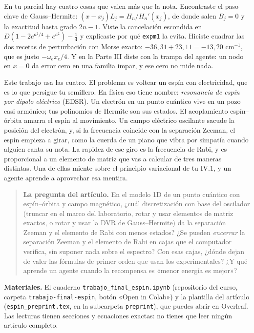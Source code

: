 En tu parcial hay cuatro cosas que valen más que la nota. Encontraste el paso clave de Gauss--Hermite: $(x-x_j)L_j = H_n/H_n'(x_j)$, de donde salen $B_j = 0$ y la exactitud hasta grado $2n-1$. Viste la cancelación escondida en $D(1-2e^{a^2/4}+e^{a^2})-\tfrac14$ y explicaste por qué \texttt{expm1} la evita. Hiciste cuadrar las dos recetas de perturbación con Morse exacto: $-36{,}31 + 23{,}11 = -13{,}20$ cm$^{-1}$, que es justo $-\omega_e x_e/4$. Y en la Parte III diste con la trampa del agente: un nodo en $x = 0$ da error cero en una familia impar, y ese cero no mide nada.

Este trabajo usa las cuatro. El problema es voltear un espín con electricidad, que es lo que persigue tu semillero. En física eso tiene nombre: \emph{resonancia de espín por dipolo eléctrico} (EDSR). Un electrón en un punto cuántico vive en un pozo casi armónico; tus polinomios de Hermite son sus estados. El acoplamiento espín--órbita amarra el espín al movimiento. Un campo eléctrico oscilante sacude la posición del electrón, y, si la frecuencia coincide con la separación Zeeman, el espín empieza a girar, como la cuerda de un piano que vibra por simpatía cuando alguien canta su nota. La rapidez de ese giro es la frecuencia de Rabi, y es proporcional a un elemento de matriz que vas a calcular de tres maneras distintas. Una de ellas miente sobre el principio variacional de tu IV.1, y un agente aprende a aprovechar esa mentira.

\begin{quote}
\textbf{La pregunta del artículo.} En el modelo 1D de un punto cuántico con espín--órbita y campo magnético, ¿cuál discretización con base del oscilador (truncar en el marco del laboratorio, rotar y usar elementos de matriz exactos, o rotar y usar la DVR de Gauss--Hermite) da la separación Zeeman y el elemento de Rabi con menos estados? ¿Se pueden \emph{encerrar} la separación Zeeman y el elemento de Rabi en cajas que el computador verifica, sin suponer nada sobre el espectro? Con esas cajas, ¿dónde dejan de valer las fórmulas de primer orden que usan los experimentales? ¿Y qué aprende un agente cuando la recompensa es «menor energía es mejor»?
\end{quote}

\textbf{Materiales.} El cuaderno \texttt{trabajo\_final\_espin.ipynb} (repositorio del curso, carpeta \texttt{trabajo-final-espin}, botón «Open in Colab») y la plantilla del artículo (\texttt{espin\_preprint.tex}, en la subcarpeta \texttt{preprint}), que puedes abrir en Overleaf. Las lecturas tienen secciones y ecuaciones exactas: no tienes que leer ningún artículo completo.

